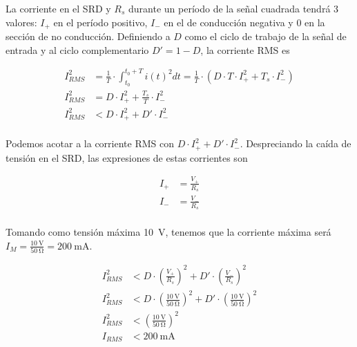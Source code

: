 La corriente en el SRD y $R_s$ durante un período de la señal cuadrada tendrá 3
valores: $I_+$ en el período positivo, $I_-$ en el de conducción negativa y $0$
en la sección de no conducción. Definiendo a $D$ como el ciclo de trabajo de la
señal de entrada y al ciclo complementario $D'=1-D$, la corriente RMS es

\begin{equation}
    \begin{aligned}
        I_{RMS}^2 &= \frac{1}{T} \cdot \int_{t_0}^{t_0+T} i(t)^2dt = \frac{1}{T}
        \cdot \left( D \cdot T \cdot I_+^2 + T_s \cdot I_-^2 \right) \\
        I_{RMS}^2 &= D \cdot I_+^2 + \frac{T_s}{T} \cdot I_-^2 \\
        I_{RMS}^2 &< D \cdot I_+^2 + D' \cdot I_-^2 \\
    \end{aligned}
\end{equation}

Podemos acotar a la corriente RMS con $D \cdot I_+^2 + D' \cdot I_-^2$.
Despreciando la caída de tensión en el SRD, las expresiones de estas corrientes son

\begin{equation}
    \begin{aligned}
        I_+ &= \frac{V_+}{R_s} \\
        I_- &= \frac{V_-}{R_s} \\
    \end{aligned}
\end{equation}

Tomando como tensión máxima \qty{10}{\volt}, tenemos que la corriente máxima será
$I_M = \frac{ \qty{10}{\volt}}{ \qty{50}{\ohm}} = \qty{200}{\milli\ampere}$.

\begin{equation}
    \begin{aligned}
        I_{RMS}^2 &< D \cdot \left( \frac{V_+}{R_s} \right) ^2 + D' \cdot
        \left( \frac{V_-}{R_s} \right) ^2 \\
        I_{RMS}^2 &< D \cdot \left( \frac{\qty{10}{\volt}}{\qty{50}{\ohm}} \right) ^2 + D' \cdot
        \left( \frac{\qty{10}{\volt}}{\qty{50}{\ohm}} \right) ^2 \\
        I_{RMS}^2 &< \left( \frac{\qty{10}{\volt}}{\qty{50}{\ohm}} \right) ^2  \\
        I_{RMS} &< \qty{200}{\milli\ampere} \\
    \end{aligned}
\end{equation}

